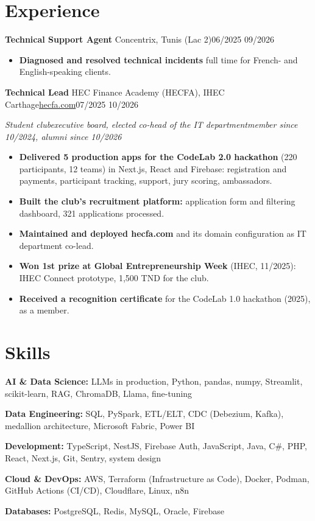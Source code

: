 \documentclass[10pt]{article}
\newcommand{\entry}[3]{\par\vspace{2pt}\textbf{#1}#2\hfill{\color{soft}#3}\par}
\newcommand{\sub}[1]{{\itshape\color{soft}#1\par}}
\newcommand{\sep}{\enspace\textperiodcentered\enspace}
\begin{document}
\section{Experience}
\entry{Technical Support Agent}{ \textendash{} Concentrix, Tunis (Lac 2)}{06/2025 \textendash{} 09/2026}
\begin{itemize}
\item \textbf{Diagnosed and resolved technical incidents} full time for French- and English-speaking clients.
\end{itemize}
\entry{Technical Lead}{ \textendash{} HEC Finance Academy (HECFA), IHEC Carthage\sep \href{https://hecfa.com}{hecfa.com}}{07/2025 \textendash{} 10/2026}
\sub{Student club\sep executive board, elected co-head of the IT department\sep member since 10/2024, alumni since 10/2026}
\begin{itemize}
\item \textbf{Delivered 5 production apps for the CodeLab 2.0 hackathon} (220 participants, 12 teams) in Next.js, React and Firebase: registration and payments, participant tracking, support, jury scoring, ambassadors.
\item \textbf{Built the club's recruitment platform:} application form and filtering dashboard, 321 applications processed.
\item \textbf{Maintained and deployed hecfa.com} and its domain configuration as IT department co-lead.
\item \textbf{Won 1st prize at Global Entrepreneurship Week} (IHEC, 11/2025): IHEC Connect prototype, 1,500 TND for the club.
\item \textbf{Received a recognition certificate} for the CodeLab 1.0 hackathon (2025), as a member.
\end{itemize}
\section{Skills}
\textbf{AI \& Data Science:} LLMs in production, Python, pandas, numpy, Streamlit, scikit-learn, RAG, ChromaDB, Llama, fine-tuning\par
\textbf{Data Engineering:} SQL, PySpark, ETL/ELT, CDC (Debezium, Kafka), medallion architecture, Microsoft Fabric, Power BI\par
\textbf{Development:} TypeScript, NestJS, Firebase Auth, JavaScript, Java, C\#, PHP, React, Next.js, Git, Sentry, system design\par
\textbf{Cloud \& DevOps:} AWS, Terraform (Infrastructure as Code), Docker, Podman, GitHub Actions (CI/CD), Cloudflare, Linux, n8n\par
\textbf{Databases:} PostgreSQL, Redis, MySQL, Oracle, Firebase\par
\end{document}
